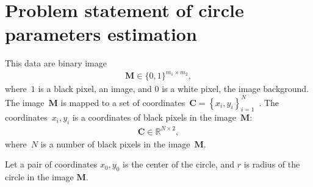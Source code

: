 \documentclass[12pt, twoside]{article}
\begin{document}
\section{Problem statement of circle parameters estimation}
This data are binary image
\[
\label{eq:st:cr:1}
\begin{aligned}
\textbf{M} \in \{0,1\}^{m_1 \times m_2},
\end{aligned}
\]
where~$1$ is a black pixel, an image, and $0$ is a white pixel, the image background.
The image~$\textbf{M}$ is mapped to a set of coordinates~$\textbf{C}=\left\{x_i, y_i\right\}_{i=1}^{N}$~. The coordinates~$x_i, y_i$ is a coordinates of black pixels in the image~$\textbf{M}$:
\[
\label{eq:st:cr:2}
\begin{aligned}
\textbf{C} \in  \mathbb{R}^{N \times 2},
\end{aligned}
\]
where~$N$ is a number of black pixels in the image~$\textbf{M}$.

Let a pair of coordinates $x_0, y_0$ is the center of the circle, and $r$ is radius of the circle in the image $\textbf{M}$.
 
\end{document}
